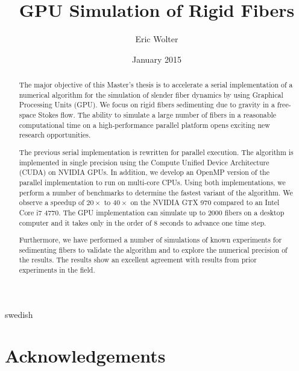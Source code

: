 \documentclass[a4paper,11pt]{kth-mag}
\title{GPU Simulation of Rigid Fibers}
\author{Eric Wolter}
\date{January 2015}
\begin{document}
\frontmatter
\pagestyle{empty}

\maketitle
{}
\begin{abstract}
The major objective of this Master's thesis is to accelerate a serial implementation of a numerical algorithm for the simulation of slender fiber dynamics by using Graphical Processing Units (GPU). We focus on rigid fibers sedimenting due to gravity in a free-space Stokes flow. The ability to simulate a large number of fibers in a reasonable computational time on a high-performance parallel platform opens exciting new research opportunities.

The previous serial implementation is rewritten for parallel execution. The algorithm is implemented in single precision using the Compute Unified Device Architecture (CUDA) on NVIDIA GPUs. In addition, we develop an OpenMP version of the parallel implementation to run on multi-core CPUs. Using both implementations, we perform a number of benchmarks to determine the fastest variant of the algorithm. We observe a speedup of $20×$ to $40×$ on the NVIDIA GTX 970 compared to an Intel Core i7 4770. The GPU implementation can simulate up to $2000$ fibers on a desktop computer and it takes only in the order of $8$ seconds to advance one time step.

Furthermore, we have performed a number of simulations of known experiments for sedimenting fibers to validate the algorithm and to explore the numerical precision of the results. The results show an excellent agreement with results from prior experiments in the field.
\end{abstract}
\clearpage

\begin{foreignabstract}{swedish}

\end{foreignabstract}
\clearpage

\section*{Acknowledgements}
\clearpage

\tableofcontents*
\clearpage

\listoffigures
\clearpage

\listoftables
\clearpage

\listoflistings
\clearpage

\mainmatter
\pagestyle{newchap}

















\printbibliography
\clearpage

\appendix
\addappheadtotoc

\end{document}
